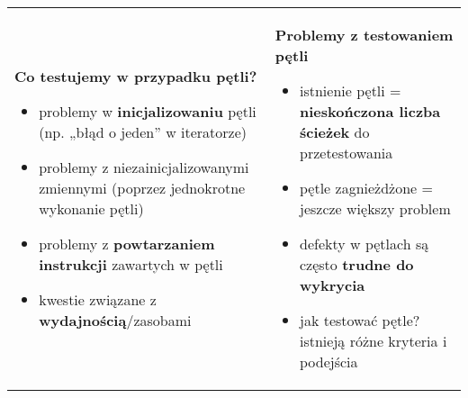 \documentclass[../main.tex]{subfiles}
\begin{document}
    \begin{table}[H]
        \begin{center}
            \begin{tabular}{ p{8cm}  p{8cm} }
                \textbf{Co testujemy w przypadku pętli?}
                \begin{itemize}
                    \item problemy w \textbf{inicjalizowaniu} pętli (np. „błąd o jeden” w iteratorze)
                    \item problemy z niezainicjalizowanymi zmiennymi (poprzez jednokrotne
                    wykonanie pętli)
                    \item problemy z \textbf{powtarzaniem instrukcji} zawartych w pętli
                    \item kwestie związane z \textbf{wydajnością}/zasobami
                \end{itemize}
                &
                \textbf{Problemy z testowaniem pętli}
                \begin{itemize}
                    \item istnienie pętli = \textbf{nieskończona liczba ścieżek} do przetestowania
                    \item pętle zagnieżdżone = jeszcze większy problem
                    \item defekty w pętlach są często \textbf{trudne do wykrycia}
                    \item jak testować pętle? istnieją różne kryteria i podejścia
                \end{itemize}
            \end{tabular}
        \end{center}
    \end{table}
\end{document}
